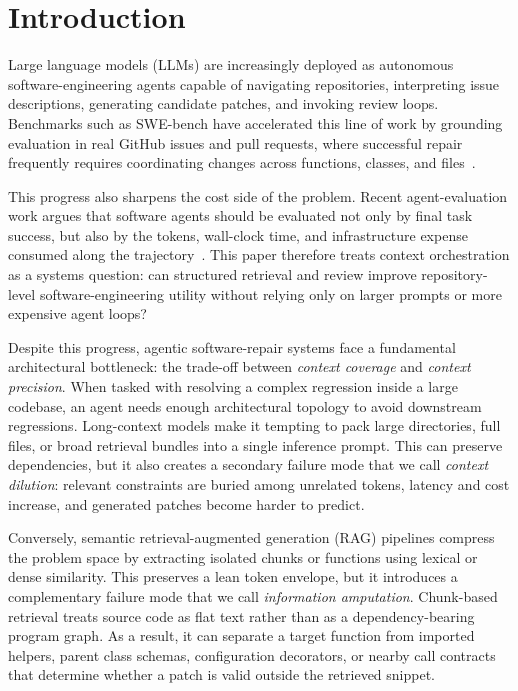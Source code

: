 \section{Introduction}
\label{sec:introduction}

Large language models (LLMs) are increasingly deployed as autonomous software-engineering agents capable of navigating repositories, interpreting issue descriptions, generating candidate patches, and invoking review loops. Benchmarks such as SWE-bench have accelerated this line of work by grounding evaluation in real GitHub issues and pull requests, where successful repair frequently requires coordinating changes across functions, classes, and files~\cite{jimenez2024swebench}.

This progress also sharpens the cost side of the problem. Recent agent-evaluation work argues that software agents should be evaluated not only by final task success, but also by the tokens, wall-clock time, and infrastructure expense consumed along the trajectory~\cite{fan2025sweeffi}. This paper therefore treats context orchestration as a systems question: can structured retrieval and review improve repository-level software-engineering utility without relying only on larger prompts or more expensive agent loops?

Despite this progress, agentic software-repair systems face a fundamental architectural bottleneck: the trade-off between \textit{context coverage} and \textit{context precision}. When tasked with resolving a complex regression inside a large codebase, an agent needs enough architectural topology to avoid downstream regressions. Long-context models make it tempting to pack large directories, full files, or broad retrieval bundles into a single inference prompt. This can preserve dependencies, but it also creates a secondary failure mode that we call \textit{context dilution}: relevant constraints are buried among unrelated tokens, latency and cost increase, and generated patches become harder to predict.

Conversely, semantic retrieval-augmented generation (RAG) pipelines compress the problem space by extracting isolated chunks or functions using lexical or dense similarity. This preserves a lean token envelope, but it introduces a complementary failure mode that we call \textit{information amputation}. Chunk-based retrieval treats source code as flat text rather than as a dependency-bearing program graph. As a result, it can separate a target function from imported helpers, parent class schemas, configuration decorators, or nearby call contracts that determine whether a patch is valid outside the retrieved snippet.

